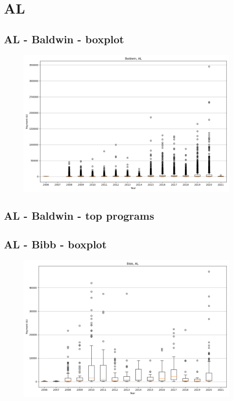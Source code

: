 \section*{AL}
\subsection*{AL - Baldwin - boxplot}
\begin{figure}[h]
\centering
\includegraphics[width=7in]{../output/boxplots/counties/Baldwin-AL_boxplot.png}
\end{figure}


\subsection*{AL - Baldwin - top programs}

\newpage
\subsection*{AL - Bibb - boxplot}
\begin{figure}[h]
\centering
\includegraphics[width=7in]{../output/boxplots/counties/Bibb-AL_boxplot.png}
\end{figure}


